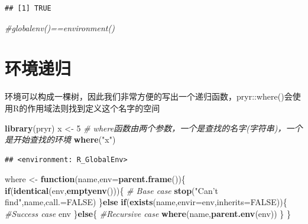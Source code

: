 \documentclass[]{book}
\newenvironment{Shaded}{\begin{snugshade}}{\end{snugshade}}
\newcommand{\KeywordTok}[1]{\textcolor[rgb]{0.13,0.29,0.53}{\textbf{#1}}}
\newcommand{\DataTypeTok}[1]{\textcolor[rgb]{0.13,0.29,0.53}{#1}}
\newcommand{\DecValTok}[1]{\textcolor[rgb]{0.00,0.00,0.81}{#1}}
\newcommand{\StringTok}[1]{\textcolor[rgb]{0.31,0.60,0.02}{#1}}
\newcommand{\CommentTok}[1]{\textcolor[rgb]{0.56,0.35,0.01}{\textit{#1}}}
\newcommand{\OtherTok}[1]{\textcolor[rgb]{0.56,0.35,0.01}{#1}}
\newcommand{\ControlFlowTok}[1]{\textcolor[rgb]{0.13,0.29,0.53}{\textbf{#1}}}
\newcommand{\NormalTok}[1]{#1}
\begin{document}
\begin{verbatim}
## [1] TRUE
\end{verbatim}

\begin{Shaded}
\begin{Highlighting}[]
\CommentTok{#globalenv()==environment()}
\end{Highlighting}
\end{Shaded}

\section{环境递归}

环境可以构成一棵树，因此我们非常方便的写出一个递归函数，pryr::where()会使用R的作用域法则找到定义这个名字的空间

\begin{Shaded}
\begin{Highlighting}[]
\KeywordTok{library}\NormalTok{(pryr)}
\NormalTok{x <-}\StringTok{ }\DecValTok{5}
\CommentTok{# where函数由两个参数，一个是查找的名字(字符串)，一个是开始查找的环境}
\KeywordTok{where}\NormalTok{(}\StringTok{"x"}\NormalTok{)}
\end{Highlighting}
\end{Shaded}

\begin{verbatim}
## <environment: R_GlobalEnv>
\end{verbatim}

\begin{Shaded}
\begin{Highlighting}[]
\NormalTok{where <-}\StringTok{ }\ControlFlowTok{function}\NormalTok{(name,}\DataTypeTok{env=}\KeywordTok{parent.frame}\NormalTok{())\{}
\ControlFlowTok{if}\NormalTok{(}\KeywordTok{identical}\NormalTok{(env,}\KeywordTok{emptyenv}\NormalTok{()))\{}
  \CommentTok{# Base case}
  \KeywordTok{stop}\NormalTok{(}\StringTok{"Can't find"}\NormalTok{,name,}\DataTypeTok{call.=}\OtherTok{FALSE}\NormalTok{)}
\NormalTok{\}}\ControlFlowTok{else} \ControlFlowTok{if}\NormalTok{(}\KeywordTok{exists}\NormalTok{(name,}\DataTypeTok{envir=}\NormalTok{env,}\DataTypeTok{inherits=}\OtherTok{FALSE}\NormalTok{))\{}
  \CommentTok{#Success case}
\NormalTok{  env}
\NormalTok{\}}\ControlFlowTok{else}\NormalTok{\{}
  \CommentTok{#Recursive case}
  \KeywordTok{where}\NormalTok{(name,}\KeywordTok{parent.env}\NormalTok{(env))}
\NormalTok{\}}
\NormalTok{\}}
\end{Highlighting}
\end{Shaded}
\end{document}
